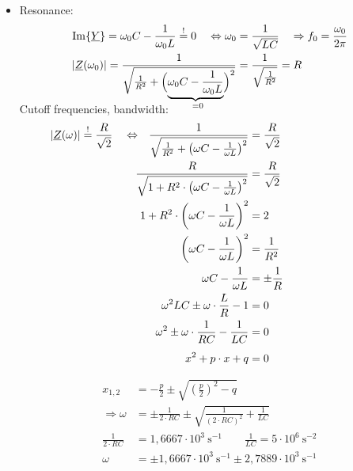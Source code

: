{\begin{itemize}
    \item[c)] Resonance:
    \begin{align*}
        \Im\{\underline{Y}\} = \omega_0 C - \frac{1}{\omega_0 L} \overset{!}{=} 0 \quad \Leftrightarrow \omega_0 &= \frac{1}{\sqrt{LC}} \quad \Rightarrow f_0 = \frac{\omega_0}{2\pi}\\
        |\underline{Z}(\omega_0)| = \frac{1}{%
            \sqrt{\frac{1}{R^2} +
                \Big(\smash{\underbrace{
                    \omega_0 C - \frac{1}{\omega_0 L}
                }_{={}\mathrlap{0}}}\Big)^2
            }
        } &= \frac{1}{\sqrt{\frac{1}{R^2}}} = R
    \end{align*}%
    Cutoff frequencies, bandwidth:
    \begin{align*}
        \mathllap{|\underline{Z}(\omega)| \overset{!}{=} \frac{R}{\sqrt{2}} \quad \Leftrightarrow \quad}
        \frac{1}{\sqrt{\frac{1}{R^2} + \left(\omega C - \frac{1}{\omega L}\right)^2}} &= \frac{R}{\sqrt{2}} \\
        \frac{R}{\sqrt{1 + R^2\cdot\left(\omega C - \frac{1}{\omega L}\right)^2}} &= \frac{R}{\sqrt{2}} \\
        1 + R^2\cdot\left(\omega C - \frac{1}{\omega L}\right)^2 &= 2 \\
        \left(\omega C - \frac{1}{\omega L}\right)^2 &= \frac{1}{R^2} \\
        \omega C - \frac{1}{\omega L} &= \pm\frac{1}{R} \\
        \omega^2 LC \pm \omega \cdot \frac{L}{R} - 1 &= 0 \\
        \omega^2 \pm \omega \cdot \frac{1}{RC} - \frac{1}{LC} &= 0 \\
        x^2 + p \cdot x + q &= 0 \vphantom{\frac{1}{LC}}%
    \end{align*}
    \begin{align*}
        x_{1,2} &= -\frac{p}{2} \pm \sqrt{\left(\frac{p}{2}\right)^2 - q} \\ %
        \Rightarrow \omega &= \pm \frac{1}{2 \cdot RC} \pm \sqrt{\frac{1}{(2 \cdot RC)^2} + \frac{1}{LC}}\\
        \frac{1}{2 \cdot RC} &= 1,6667 \cdot 10^3\ \mathrm{s}^{-1} \qquad
        \frac{1}{LC} = 5 \cdot 10^6\ \mathrm{s}^{-2} \\[4pt]
        \omega &= \pm 1,6667 \cdot 10^3\ \mathrm{s}^{-1} \pm 2,7889 \cdot 10^3\ \mathrm{s}^{-1} \\[4pt]

\end{align*}
\end{itemize}}
